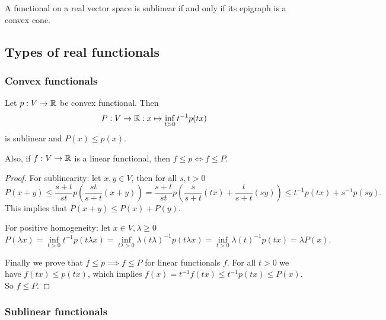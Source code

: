 \begin{corollary}
A functional on a real vector space is sublinear \textup{if and only if} its epigraph is a convex cone.
\end{corollary}

\subsection{Types of real functionals}
\subsubsection{Convex functionals}

\begin{proposition}
Let $p: V\to\mathbb{R}$ be convex functional. Then
\[ P: V\to\mathbb{R}: x\mapsto \inf_{t>0} t^{-1}p(tx) \]
is sublinear and $P(x)\leq p(x)$.

Also, if $f:V\to \mathbb{R}$ is a linear functional, then $f\leq p \iff f\leq P$.
\end{proposition}
\begin{proof}
For sublinearity: let $x,y\in V$, then for all $s,t>0$
\[ P(x+y) \leq \frac{s+t}{st}p\left(\frac{st}{s+t}(x+y)\right) = \frac{s+t}{st}p\left(\frac{s}{s+t}(tx)+\frac{t}{s+t}(sy)\right) \leq t^{-1}p(tx) + s^{-1}p(sy). \]
This implies that $P(x+y)\leq P(x)+P(y)$.

For positive homogeneity: let $x\in V,\lambda\geq 0$
\[ P(\lambda x) = \inf_{t>0} t^{-1}p(t\lambda x) = \inf_{t\lambda>0} \lambda (t\lambda)^{-1}p(t\lambda x) = \inf_{t>0} \lambda (t)^{-1}p(tx) = \lambda P(x). \]

Finally we prove that $f\leq p \implies f\leq P$ for linear functionals $f$. For all $t>0$ we have $f(tx) \leq p(tx)$, which implies $f(x) = t^{-1}f(tx) \leq t^{-1}p(tx) \leq P(x)$. So $f\leq P$.
\end{proof}

\subsubsection{Sublinear functionals}


